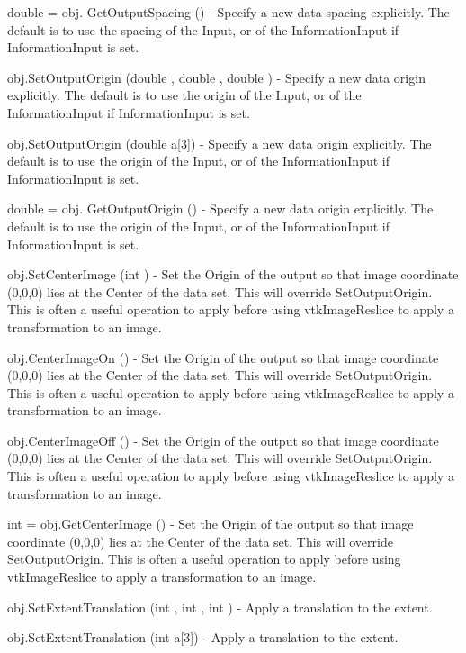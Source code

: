 \begin{DoxyItemize}
\item {\ttfamily double = obj. Get\-Output\-Spacing ()} -\/ Specify a new data spacing explicitly. The default is to use the spacing of the Input, or of the Information\-Input if Information\-Input is set.  
\item {\ttfamily obj.\-Set\-Output\-Origin (double , double , double )} -\/ Specify a new data origin explicitly. The default is to use the origin of the Input, or of the Information\-Input if Information\-Input is set.  
\item {\ttfamily obj.\-Set\-Output\-Origin (double a\mbox{[}3\mbox{]})} -\/ Specify a new data origin explicitly. The default is to use the origin of the Input, or of the Information\-Input if Information\-Input is set.  
\item {\ttfamily double = obj. Get\-Output\-Origin ()} -\/ Specify a new data origin explicitly. The default is to use the origin of the Input, or of the Information\-Input if Information\-Input is set.  
\item {\ttfamily obj.\-Set\-Center\-Image (int )} -\/ Set the Origin of the output so that image coordinate (0,0,0) lies at the Center of the data set. This will override Set\-Output\-Origin. This is often a useful operation to apply before using vtk\-Image\-Reslice to apply a transformation to an image.  
\item {\ttfamily obj.\-Center\-Image\-On ()} -\/ Set the Origin of the output so that image coordinate (0,0,0) lies at the Center of the data set. This will override Set\-Output\-Origin. This is often a useful operation to apply before using vtk\-Image\-Reslice to apply a transformation to an image.  
\item {\ttfamily obj.\-Center\-Image\-Off ()} -\/ Set the Origin of the output so that image coordinate (0,0,0) lies at the Center of the data set. This will override Set\-Output\-Origin. This is often a useful operation to apply before using vtk\-Image\-Reslice to apply a transformation to an image.  
\item {\ttfamily int = obj.\-Get\-Center\-Image ()} -\/ Set the Origin of the output so that image coordinate (0,0,0) lies at the Center of the data set. This will override Set\-Output\-Origin. This is often a useful operation to apply before using vtk\-Image\-Reslice to apply a transformation to an image.  
\item {\ttfamily obj.\-Set\-Extent\-Translation (int , int , int )} -\/ Apply a translation to the extent.  
\item {\ttfamily obj.\-Set\-Extent\-Translation (int a\mbox{[}3\mbox{]})} -\/ Apply a translation to the extent.  

\end{DoxyItemize}
